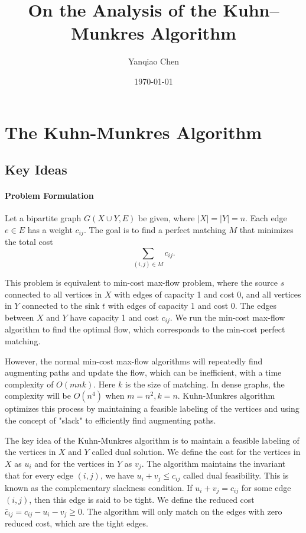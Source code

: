 \documentclass[acmsmall,nonacm]{acmart}
\title{On the Analysis of the Kuhn--Munkres Algorithm}
\author{Yanqiao Chen}
\affiliation{%
  \institution{Southern University of Science and Technology}
  \department{Department of Computer Science and Engineering}
  \city{Shenzhen}
  \country{China}
}
\date{\today}
\theoremstyle{plain}
\theoremstyle{remark}
\begin{document}
\maketitle

\section{The Kuhn-Munkres Algorithm}
\label{sec:km}

\subsection{Key Ideas} 
\label{subsec:key-ideas}

\paragraph{Problem Formulation} Let a bipartite graph $G(X \cup Y, E)$ be given, where $|X| = |Y| = n$. Each edge $e \in E$ has a weight $c_{ij}$. The goal is to find a perfect matching $M$ that minimizes the total cost
\begin{equation}
    \label{eq:matching-objective}
    \sum_{(i,j) \in M} c_{ij}.
\end{equation}

This problem is equivalent to min-cost max-flow problem, where the source $s$ connected to all vertices in $X$ with edges of capacity 1 and cost 0, and all vertices in $Y$ connected to the sink $t$ with edges of capacity 1 and cost 0. The edges between $X$ and $Y$ have capacity 1 and cost $c_{ij}$. We run the min-cost max-flow algorithm to find the optimal flow, which corresponds to the min-cost perfect matching.

However, the normal min-cost max-flow algorithms will repeatedly find augmenting paths and update the flow, which can be inefficient, with a time complexity of $O(mnk)$. Here $k$ is the size of matching. In dense graphs, the complexity will be $O(n^4)$ when $m = n^2, k = n$. Kuhn-Munkres algorithm optimizes this process by maintaining a feasible labeling of the vertices and using the concept of "slack" to efficiently find augmenting paths.

The key idea of the Kuhn-Munkres algorithm is to maintain a feasible labeling of the vertices in $X$ and $Y$ called dual solution. We define the cost for the vertices in $X$ as $u_i$ and for the vertices in $Y$ as $v_j$. The algorithm maintains the invariant that for every edge $(i,j)$, we have $u_i + v_j \leq c_{ij}$ called dual feasibility. This is known as the complementary slackness condition. If $u_i + v_j = c_{ij}$ for some edge $(i,j)$, then this edge is said to be tight. We define the reduced cost $\bar{c}_{ij} = c_{ij} - u_i - v_j \geq 0$. The algorithm will only match on the edges with zero reduced cost, which are the tight edges. 
\end{document}
